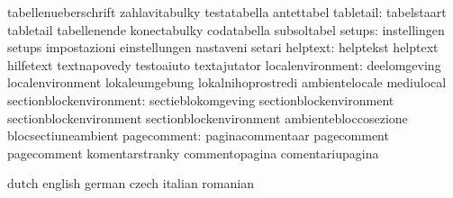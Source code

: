                            tabellenueberschrift      zahlavitabulky
                           testatabella              antettabel
                tabletail: tabelstaart               tabletail
                           tabellenende              konectabulky
                           codatabella               subsoltabel
                   setups: instellingen              setups
                           impostazioni              einstellungen
                           nastaveni                 setari
                 helptext: helptekst                 helptext
                           hilfetext                 textnapovedy
                           testoaiuto                textajutator
         localenvironment: deelomgeving              localenvironment
                           lokaleumgebung            lokalnihoprostredi
                           ambientelocale            mediulocal
  sectionblockenvironment: sectieblokomgeving        sectionblockenvironment
                           sectionblockenvironment   sectionblockenvironment
                           ambientebloccosezione     blocsectiuneambient %
              pagecomment: paginacommentaar          pagecomment
                           pagecomment               komentarstranky
                           commentopagina            comentariupagina %

\stopvariables




\startvariables            dutch                     english
                           german                    czech
                           italian                   romanian

